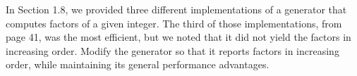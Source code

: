  \label{sssec:ex1_27}

In Section 1.8, we provided three different implementations of a generator that computes factors of a given integer. The third of those implementations, from page 41, was the most efficient, but we noted that it did not yield the factors in increasing order. Modify the generator so that it reports factors in increasing order, while maintaining its general performance advantages.

